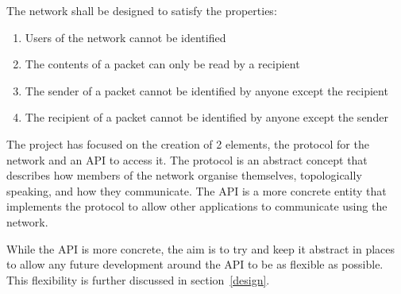 	The network shall be designed to satisfy the properties:
	\begin{enumerate}
		\item Users of the network cannot be identified
		\item The contents of a packet can only be read by a recipient
		\item The sender of a packet cannot be identified by anyone except the recipient
		\item The recipient of a packet cannot be identified by anyone except the sender
	\end{enumerate}
	
	The project has focused on the creation of 2 elements, the protocol for the network and an API to access it. The protocol is an abstract concept that describes how members of the network organise themselves, topologically speaking, and how they communicate. The API is a more concrete entity that implements the protocol to allow other applications to communicate using the network. 
	
	While the API is more concrete, the aim is to try and keep it abstract in places to allow any future development around the API to be as flexible as possible. This flexibility is further discussed in section~\ref{design}.